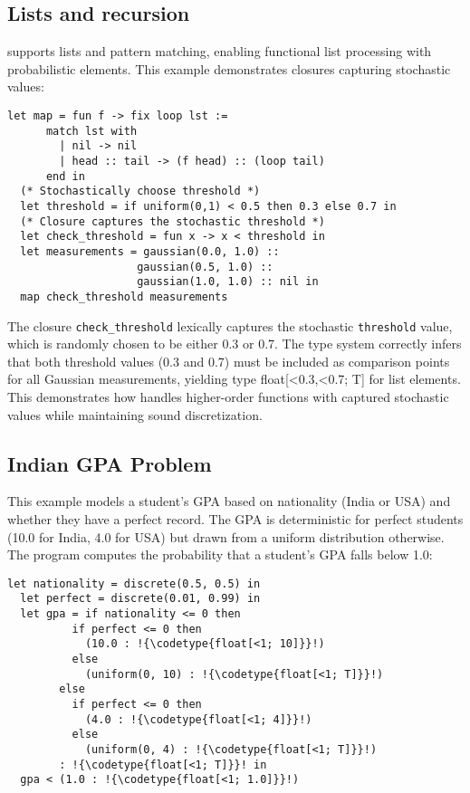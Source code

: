 \documentclass[acmsmall,screen,dvipsnames,x11names,nonacm,anonymous,review]{acmart}
\newcommand{\codetype}[1]{\textcolor{typecolor}{\ttfamily\small#1}}
\newcommand{\Slice}{\text{\scshape Slice}\xspace}
\begin{document}
\subsection{Lists and recursion}

\Slice supports lists and pattern matching, enabling functional list processing with probabilistic elements. This example demonstrates closures capturing stochastic values:

\begin{lstlisting}[aboveskip=1em,belowskip=1em,escapechar=!]
  let map = fun f -> fix loop lst :=
      match lst with
        | nil -> nil
        | head :: tail -> (f head) :: (loop tail)
      end in
  (* Stochastically choose threshold *)
  let threshold = if uniform(0,1) < 0.5 then 0.3 else 0.7 in
  (* Closure captures the stochastic threshold *)
  let check_threshold = fun x -> x < threshold in
  let measurements = gaussian(0.0, 1.0) :: 
                    gaussian(0.5, 1.0) :: 
                    gaussian(1.0, 1.0) :: nil in
  map check_threshold measurements
\end{lstlisting}

\noindent The closure \texttt{check\_threshold} lexically captures the stochastic \texttt{threshold} value, which is randomly chosen to be either 0.3 or 0.7. The type system correctly infers that both threshold values (0.3 and 0.7) must be included as comparison points for all Gaussian measurements, yielding type \codetype{float[<0.3,<0.7; T]} for list elements. This demonstrates how \Slice handles higher-order functions with captured stochastic values while maintaining sound discretization.


\subsection{Indian GPA Problem}\label{sec:gpa}

This example models a student's GPA based on nationality (India or USA) and whether they have a perfect record. The GPA is deterministic for perfect students (10.0 for India, 4.0 for USA) but drawn from a uniform distribution otherwise. The program computes the probability that a student's GPA falls below 1.0:

\begin{lstlisting}[aboveskip=1em,belowskip=1em,escapechar=!]
  let nationality = discrete(0.5, 0.5) in
  let perfect = discrete(0.01, 0.99) in
  let gpa = if nationality <= 0 then
          if perfect <= 0 then
            (10.0 : !{\codetype{float[<1; 10]}}!)
          else
            (uniform(0, 10) : !{\codetype{float[<1; T]}}!)
        else
          if perfect <= 0 then
            (4.0 : !{\codetype{float[<1; 4]}}!)
          else
            (uniform(0, 4) : !{\codetype{float[<1; T]}}!)
        : !{\codetype{float[<1; T]}}! in
  gpa < (1.0 : !{\codetype{float[<1; 1.0]}}!)
\end{lstlisting}
\end{document}
